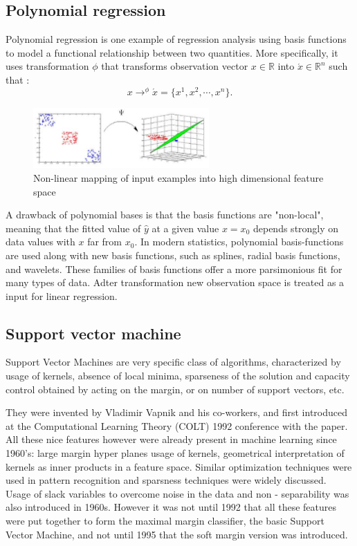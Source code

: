 \subsection{Polynomial regression}
Polynomial regression is one example of regression analysis using basis functions to model 
a functional relationship between two quantities.
More specifically, it uses transformation $\phi$  that transforms observation vector 
$x \in \mathbb{R}$ into  $ \acute{x} \in \mathbb{R}^{n}$ such that :
\begin{equation}
 x \to^{\phi} \acute{x} = \{x^{1}, x^{2}, \cdots, x^{n}\}.
\end{equation}
\begin{figure}[htb] 
	\label{fig:space_transformation}
	\centering
	\includegraphics[width=0.6\textwidth]{figures/space_transformation}
	\caption{Non-linear mapping of input examples into high dimensional feature space}
\end{figure}
A drawback of polynomial bases is that the basis functions are "non-local",
meaning that the fitted value of $\hat{y}$ at a given value $x = x_{0}$ depends strongly on 
data values with $x$ far from $x_{0}$.
In modern statistics, polynomial basis-functions are used along with new basis functions,
such as splines, radial basis functions, and wavelets.
These families of basis functions offer a more parsimonious fit for many types of data. 
Adter transformation new observation space is treated as a input for linear regression.


\subsection{Support vector machine}
Support Vector Machines are very specific class of algorithms, 
characterized by usage of kernels, absence of local minima, sparseness of the solution and 
capacity control obtained by acting on the margin, or on number of support vectors, etc.

They were invented by Vladimir Vapnik and his co-workers, 
and first introduced at the Computational Learning Theory (COLT) 1992 conference with the paper.
All these nice features however were already present in machine learning since 1960’s: 
large margin hyper planes usage of kernels, geometrical interpretation of kernels as inner
products in a feature space.
Similar optimization techniques were used in pattern recognition and sparsness techniques 
were widely discussed.
Usage of slack variables to overcome noise in the data and non - separability was also
introduced in 1960s.
However it was not until 1992 that all these features were put together to form the
maximal margin classifier, the basic Support Vector Machine, and not until 1995 that the
soft margin version was introduced.

